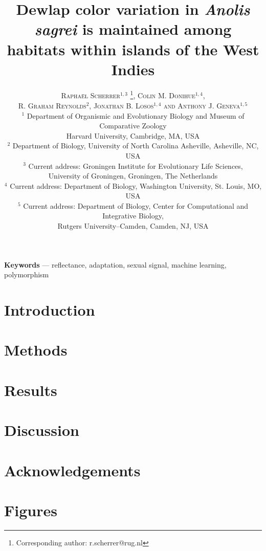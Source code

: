 \documentclass{article}
\title{Dewlap color variation in \textit{Anolis sagrei} is maintained among habitats within islands of the West Indies}
\author{
	
    \textsc{Rapha\"{e}l Scherrer$^{1,3}$ \thanks{Corresponding author: r.scherrer@rug.nl}, Colin M. Donihue$^{1,4}$, }\\
	\textsc{R. Graham Reynolds$^2$, Jonathan B. Losos$^{1,4}$ and Anthony J. Geneva$^{1,5}$} \\[1ex]
	
	\normalsize $^1$ Department of Organismic and Evolutionary Biology and Museum of Comparative Zoology \\ \normalsize Harvard University, Cambridge, MA, USA \\
	\normalsize $^2$ Department of Biology, University of North Carolina Asheville, Asheville, NC, USA\\ 
	\normalsize $^3$ Current address: Groningen Institute for Evolutionary Life Sciences,\\
	\normalsize University of Groningen, Groningen, The Netherlands\\
	\normalsize $^4$ Current address: Department of Biology, Washington University, St. Louis, MO, USA\\
	\normalsize $^5$ Current address: Department of Biology, Center for Computational and Integrative Biology,\\ \normalsize Rutgers University--Camden, Camden, NJ, USA
	
}
\date{} %
\begin{document}
	
	\linenumbers
	
	\maketitle

	\begin{abstract}
    	
	\end{abstract}

	\textbf{Keywords} --- reflectance, adaptation, sexual signal, machine learning, polymorphism

	\section*{Introduction}
	
	

	\pagebreak
	
	\section*{Methods}

	

	\pagebreak
	
	\section*{Results}

	

	\pagebreak

	\section*{Discussion}

	

	\pagebreak
	
	\section*{Acknowledgements}

	
	
	\pagebreak

	\section*{Figures}

	
\end{document}
